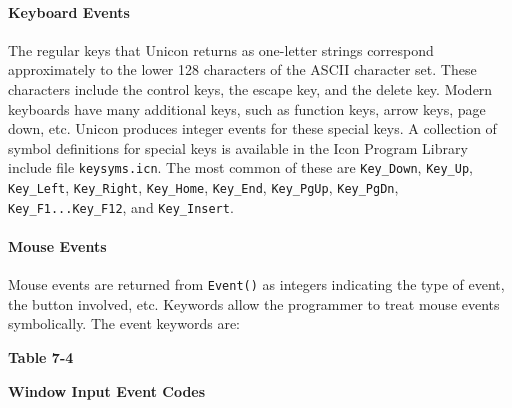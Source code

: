 \paragraph{Keyboard Events}
The regular keys that Unicon returns as one-letter strings correspond
approximately to the lower 128 characters of the ASCII character set.
These characters include the control keys, the escape key, and the
delete key. Modern keyboards have many additional keys, such as
function keys, arrow keys, {\textquotedbl}page down{\textquotedbl},
etc. Unicon produces integer events for these special keys. A
collection of symbol definitions for special keys is available in the
Icon Program Library include file \texttt{keysyms.icn}. The most common
of these are \texttt{Key\_Down}, \texttt{Key\_Up}, \texttt{Key\_Left},
\texttt{Key\_Right}, \texttt{Key\_Home}, \texttt{Key\_End},
\texttt{Key\_PgUp}, \texttt{Key\_PgDn}, \texttt{Key\_F1...Key\_F12},
and \texttt{Key\_Insert}.

\paragraph{Mouse Events}
Mouse events are returned from \texttt{Event()} as integers indicating
the type of event, the button involved, etc. Keywords allow the
programmer to treat mouse events symbolically. The event keywords are:

{\centering\sffamily\bfseries
Table 7-4
\par}

{\centering\sffamily\bfseries
Window Input Event Codes
\par}

